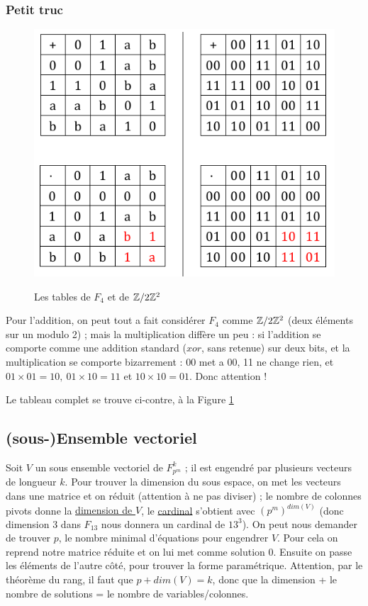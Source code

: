 \documentclass[11pt,a4paper]{article}
\begin{document}
\subsubsection{Petit truc}
\begin{figure}
	\centering
	\captionsetup{justification=centering}
	\caption{Les tables de $F_4$ et de $\mathbb{Z}/2\mathbb{Z}^2$}
	\includegraphics[scale=0.5]{images/tables_f4}
	\label{f4_z4}
\end{figure}
Pour l'addition, on peut tout a fait considérer $F_4$ comme $\mathbb{Z}/2\mathbb{Z}^2$ (deux éléments sur un modulo 2) ; mais la multiplication diffère un peu : si l'addition se comporte comme une addition standard ($xor$, sans retenue) sur deux bits, et la multiplication se comporte bizarrement : 00 met a 00, 11 ne change rien, et $01\times 01 = 10,\ 01\times 10 = 11$ et $10\times 10 = 01$. Donc attention !

Le tableau complet se trouve ci-contre, à la Figure \ref{f4_z4}

\subsection{(sous-)Ensemble vectoriel}
Soit $V$ un sous ensemble vectoriel  de $F_{p^m}^k$ ; il est engendré par plusieurs vecteurs de longueur $k$. Pour trouver la dimension du sous espace, on met les vecteurs dans une matrice et on réduit (attention à ne pas diviser) ; le nombre de colonnes pivots donne la \uline{dimension de $V$}, le \uline{cardinal} s'obtient avec $(p^m)^{dim(V)}$ (donc dimension 3 dans $F_{13}$ nous donnera un cardinal de $13^3$). On peut nous demander de trouver $p$, le nombre minimal d'équations pour engendrer $V$. Pour cela on reprend notre matrice réduite et on lui met comme solution 0. Ensuite on passe les éléments de l'autre côté, pour trouver la forme paramétrique. Attention, par le théorème du rang, il faut que $p + dim(V) = k$, donc que la dimension + le nombre de solutions = le nombre de variables/colonnes.
\end{document}
